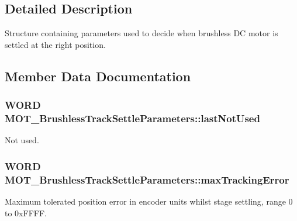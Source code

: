 \subsection{Detailed Description}
Structure containing parameters used to decide when brushless DC motor is settled at the right position. 



\subsection{Member Data Documentation}
\subsubsection[{\texorpdfstring{last\+Not\+Used}{lastNotUsed}}]{\setlength{\rightskip}{0pt plus 5cm}W\+O\+RD M\+O\+T\+\_\+\+Brushless\+Track\+Settle\+Parameters\+::last\+Not\+Used}\hypertarget{struct_m_o_t___brushless_track_settle_parameters_af87f00a398c92f61bde830f72befd210}{}\label{struct_m_o_t___brushless_track_settle_parameters_af87f00a398c92f61bde830f72befd210}


Not used. 

\subsubsection[{\texorpdfstring{max\+Tracking\+Error}{maxTrackingError}}]{\setlength{\rightskip}{0pt plus 5cm}W\+O\+RD M\+O\+T\+\_\+\+Brushless\+Track\+Settle\+Parameters\+::max\+Tracking\+Error}\hypertarget{struct_m_o_t___brushless_track_settle_parameters_ae5e2310450c358ef397286a9ce4598a7}{}\label{struct_m_o_t___brushless_track_settle_parameters_ae5e2310450c358ef397286a9ce4598a7}


Maximum tolerated position error in encoder units whilst stage settling, range 0 to 0x\+F\+F\+FF. 


